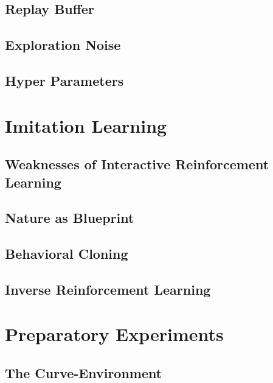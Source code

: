     \subsection{Replay Buffer}\label{subchap:buffer}
    
    \subsection{Exploration Noise}
    
    \subsection{Hyper Parameters}\label{subchap:hyperparameters}
    

    
\newpage
\section{Imitation Learning} \label{chap:imitation}
    
        \subsection{Weaknesses of Interactive Reinforcement Learning} \label{subchap:weak}
         
        \subsection{Nature as Blueprint}\label{subchap:nature}
        
        \subsection{Behavioral Cloning}
        
        \subsection{Inverse Reinforcement Learning}\label{subchap:inverse}
        
\newpage
\section{Preparatory Experiments} \label{chap:synthetic}

    \subsection{The Curve-Environment}\label{subchap:curveEnv}
        
